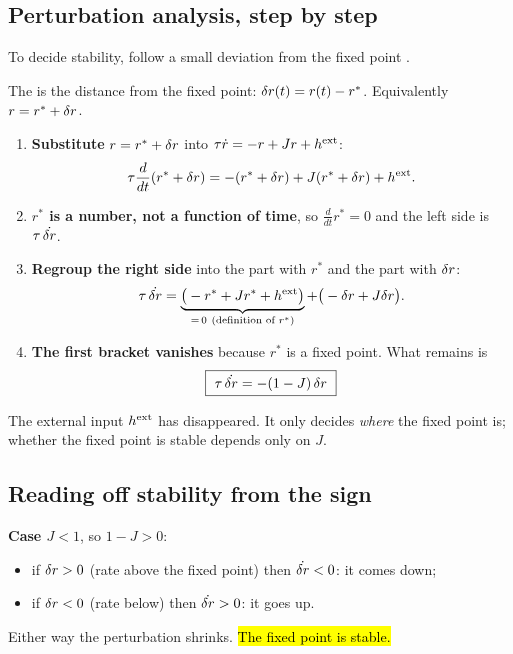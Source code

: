 \subsection{Perturbation analysis, step by step}

To decide stability, follow a small deviation from the fixed point .

\begin{defn}[Perturbation]
The  is the distance from the fixed point: $\delta r(t) = r(t)-r^*$. Equivalently $r = r^*+\delta r$.
\end{defn}

\begin{enumerate}
  \item \textbf{Substitute} $r = r^*+\delta r$ into $\tau\dot r = -r+Jr+h^{\text{ext}}$:
        \[ \tau\frac{d}{dt}(r^*+\delta r) = -(r^*+\delta r) + J(r^*+\delta r) + h^{\text{ext}}. \]
  \item \textbf{$r^*$ is a number, not a function of time}, so $\frac{d}{dt}r^* = 0$ and the left side is $\tau\,\dot{\delta r}$.
  \item \textbf{Regroup the right side} into the part with $r^*$ and the part with $\delta r$:
        \[ \tau\,\dot{\delta r} = \underbrace{\big(-r^*+Jr^*+h^{\text{ext}}\big)}_{=\,0\ \text{(definition of } r^*)} + \big(-\delta r + J\delta r\big). \]
  \item \textbf{The first bracket vanishes} because $r^*$ is a fixed point. What remains is
        \[ \boxed{\ \tau\,\dot{\dr} = -(1-J)\,\dr\ } \]
\end{enumerate}

\begin{intuition}
The external input $h^{\text{ext}}$ has disappeared. It only decides \emph{where} the fixed point is; whether the fixed point is stable depends only on $J$.
\end{intuition}

\subsection{Reading off stability from the sign}

\textbf{Case $J<1$}, so $1-J>0$:
\begin{itemize}
  \item if $\delta r>0$ (rate above the fixed point) then $\dot{\delta r}<0$: it comes down;
  \item if $\delta r<0$ (rate below) then $\dot{\delta r}>0$: it goes up.
\end{itemize}
Either way the perturbation shrinks. \hl{The fixed point is stable.}

